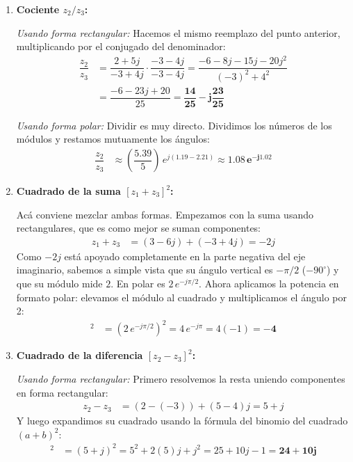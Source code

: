 \documentclass[10pt,a4paper]{article}
\begin{document}
\begin{enumerate}[label=\textbf{\alph*)}]
		\textit{Usando forma polar:} Para invertir en polar solo invertimos la magnitud del módulo y le cambiamos el signo al ángulo:
		\begin{align*}
			z_1^{-1} &= \dfrac{1}{6.71\, e^{-j1.11}} = \left(\dfrac{1}{6.71}\right)\, e^{j1.11} \approx \mathbf{0.15\, e^{j1.11}}
		\end{align*}
		
		\item \textbf{Cociente $z_2 / z_3$:} 
		
        \textit{Usando forma rectangular:} Hacemos el mismo reemplazo del punto anterior, multiplicando por el conjugado del denominador:
		\begin{align*}
			\dfrac{z_2}{z_3} &= \dfrac{2+5j}{-3+4j} \cdot \dfrac{-3-4j}{-3-4j} = \dfrac{-6 - 8j - 15j - 20j^2}{(-3)^2+4^2} \\
			&= \dfrac{-6 - 23j + 20}{25} = \mathbf{\dfrac{14}{25} - j\dfrac{23}{25}}
		\end{align*}
		
        \textit{Usando forma polar:} Dividir es muy directo. Dividimos los números de los módulos y restamos mutuamente los ángulos:
        \begin{align*}
            \dfrac{z_2}{z_3} &\approx \left( \dfrac{5.39}{5} \right)\, e^{j(1.19 - 2.21)} \approx \mathbf{1.08\, e^{-j1.02}}
        \end{align*}
        
		\item \textbf{Cuadrado de la suma $[z_1+z_3]^2$:}
		
        Acá conviene mezclar ambas formas. Empezamos con la suma usando rectangulares, que es como mejor se suman componentes:
		\begin{align*}
			z_1+z_3 &= (3-6j) + (-3+4j) = -2j
		\end{align*}
		Como $-2j$ está apoyado completamente en la parte negativa del eje imaginario, sabemos a simple vista que su ángulo vertical es $-\pi/2$ ($-90^\circ$) y que su módulo mide $2$. En polar es $2\, e^{-j\pi/2}$. Ahora aplicamos la potencia en formato polar: elevamos el módulo al cuadrado y multiplicamos el ángulo por 2:
		\begin{align*}
			[z_1+z_3]^2 &= (2\, e^{-j\pi/2})^2 = 4\, e^{-j\pi} = 4(-1) = \mathbf{-4}
		\end{align*}
		
		\item \textbf{Cuadrado de la diferencia $[z_2 - z_3]^2$:}
        
        \textit{Usando forma rectangular:} Primero resolvemos la resta uniendo componentes en forma rectangular:
		\begin{align*}
			z_2 - z_3 &= (2 - (-3)) + (5-4)j = 5 + j
		\end{align*}
		Y luego expandimos su cuadrado usando la fórmula del binomio del cuadrado $(a+b)^2$:
		\begin{align*}
			[z_2 - z_3]^2 &= (5+j)^2 = 5^2 + 2(5)j + j^2 = 25 + 10j - 1 = \mathbf{24 + 10j}
		\end{align*}


\end{enumerate}
\end{document}
